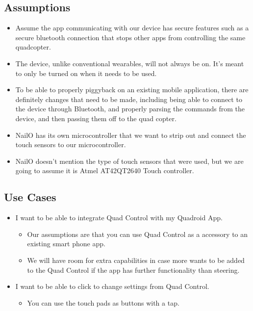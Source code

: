 \documentclass[12pt,letterpaper]{article}
\begin{document}
\subsection*{Assumptions}
\begin{itemize}
\item Assume the app communicating with our device has secure features such as a secure bluetooth connection that stops other apps from controlling the same quadcopter. 
\item The device, unlike conventional wearables, will not always be on. It’s meant to only be turned on when it needs to be used. 
\item To be able to properly piggyback on an existing  mobile application, there are definitely changes that need to be made, including being able to connect to the device through Bluetooth, and properly parsing the commands from the device, and then passing them off to the quad copter.
\item NailO has its own microcontroller that we want to strip out and connect the touch sensors to our microcontroller.
\item NailO doesn't mention the type of touch sensors that were used, but we are going to assume it is Atmel AT42QT2640 Touch controller.
\end{itemize}

\subsection*{Use Cases}
\begin{itemize}
\item I want to be able to integrate Quad Control with my Quadroid App.
	\begin{itemize}
		\item Our assumptions are that you can use Quad Control as a accessory to an existing smart phone app.
		\item We will have room for extra capabilities in case more wants to be added to the Quad Control if the app has further functionality than steering.
	\end{itemize}
\item I want to be able to click to change settings from Quad Control.
	\begin{itemize}
		\item You can use the touch pads as buttons with a tap.
	\end{itemize}
\end{itemize}
\end{document}
